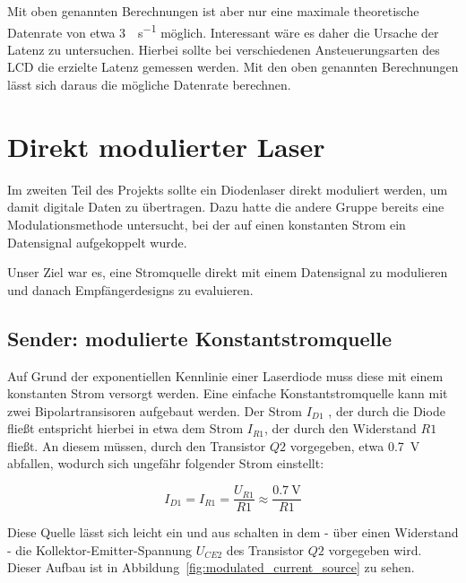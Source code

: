 \documentclass[12pt,a4paper]{article}
\begin{document}
Mit oben genannten Berechnungen ist aber nur eine maximale theoretische Datenrate von etwa \SI{3}{\bit\per\second} möglich. Interessant wäre es daher die Ursache der Latenz zu untersuchen. Hierbei sollte bei verschiedenen Ansteuerungsarten des LCD die erzielte Latenz gemessen werden. Mit den oben genannten Berechnungen lässt sich daraus die mögliche Datenrate berechnen.

\section{Direkt modulierter Laser}
Im zweiten Teil des Projekts sollte ein Diodenlaser direkt moduliert werden, um damit digitale Daten zu übertragen. Dazu hatte die andere Gruppe bereits eine Modulationsmethode untersucht, bei der auf einen konstanten Strom ein Datensignal aufgekoppelt wurde.

Unser Ziel war es, eine Stromquelle direkt mit einem Datensignal zu modulieren und danach Empfängerdesigns zu evaluieren.


\subsection{Sender: modulierte Konstantstromquelle}
\label{sec:direct_tx}
Auf Grund der exponentiellen Kennlinie einer Laserdiode muss diese mit einem konstanten Strom versorgt werden. Eine einfache Konstantstromquelle kann mit zwei Bipolartransisoren aufgebaut werden. Der Strom $I_{D1}$ , der durch die Diode fließt entspricht hierbei in etwa dem Strom $I_{R1}$, der durch den Widerstand $R1$ fließt. An diesem müssen, durch den Transistor  $Q2$ vorgegeben, etwa \SI{0.7}{\volt} abfallen, wodurch sich ungefähr folgender Strom einstellt:

\begin{equation}
I_{D1} = I_{R1} = \frac{U_{R1}}{R1} \approx \frac{\SI{0.7}{\volt}}{R1}
\end{equation}

Diese Quelle lässt sich leicht ein und aus schalten in dem - über einen Widerstand - die Kollektor-Emitter-Spannung $U_{CE2}$ des Transistor $Q2$ vorgegeben wird. Dieser Aufbau ist in Abbildung~\ref{fig:modulated_current_source} zu sehen.
\end{document}
